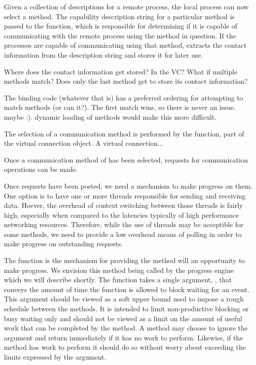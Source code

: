Given a collection of descriptions for a remote process, the local process can
now select a method.  The capability description string for a particular method
is passed to the  function, which is
responsible for determining if it is capable of communicating with the remote
process using the method in question.  If the processes are capable of
communicating using that method,  extracts the contact
information from the description string and stores it for later use.

\begin{cmt}[BRT]
  Where does the contact information get stored?  In the VC?  What if multiple
  methods match?  Does only the last method get to store its contact
  information?
\end{cmt}

\begin{cmt}[ROB]
  The binding code (whatever that is) has a preferred ordering for attempting
  to match methods (or can it?).  The first match wins, so there is never an
  issue.  maybe :).  dynamic loading of methods would make this more difficult.
\end{cmt}

The selection of a communication method is performed by the
 function, part of the virtual connection object.  A
virtual connection... 

Once a communication method of has been selected, requests for communication
operations can be made.  


Once requests have been posted, we need a mechanism to make progress on them.
One option is to have one or more threads responsible for sending and receiving
data.  Hoever, the overhead of context switching between those threads is
fairly high, especially when compared to the latencies typically of high
performance networking resources.  Therefore, while the use of threads may be
acceptible for some methods, we need to provide a low overhead means of polling
in order to make progress on outstanding requests.

The  function is the mechanism for providing the method will
an opportunity to make progress.  We envision this method being called by the
progress engine which we will describe shortly.  The  function takes
a single argument, , that conveys the amount of time the function
is allowed to block waiting for an event.  This argument should be viewed as a
soft upper bound used to impose a rough schedule between the methods.  It is
intended to limit non-productive blocking or busy waiting only and should not
be viewed as a limit on the amount of useful work that can be completed by the
method.  A method may choose to ignore the argument and return immediately if
it has no work to perform.  Likewise, if the method has work to perform it
should do so without worry about exceeding the limits expressed by the
 argument.


